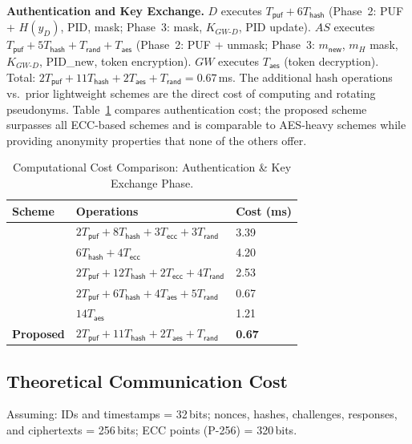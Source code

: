 \documentclass[conference]{IEEEtran}
\begin{document}
\textbf{Authentication and Key Exchange.}
$D$ executes $T_\mathsf{puf} + 6T_\mathsf{hash}$ (Phase~2: PUF +
$H(y_D)$, PID, mask; Phase~3: mask, $K_{GW\text{-}D}$, PID update).
$AS$ executes $T_\mathsf{puf} + 5T_\mathsf{hash} + T_\mathsf{rand} +
T_\mathsf{aes}$ (Phase~2: PUF + unmask; Phase~3: $m_\mathsf{new}$,
$m_H$ mask, $K_{GW\text{-}D}$, PID\_new, token encryption).
$GW$ executes $T_\mathsf{aes}$ (token decryption).
Total: $2T_\mathsf{puf} + 11T_\mathsf{hash} + 2T_\mathsf{aes} +
T_\mathsf{rand} = 0.67$\,ms.  The additional hash operations vs.\ prior
lightweight schemes are the direct cost of computing and rotating pseudonyms.
Table~\ref{tab:comp_auth} compares authentication cost; the proposed scheme
surpasses all ECC-based schemes and is comparable to AES-heavy schemes while
providing anonymity properties that none of the others offer.

\begin{table}[!t]
  \centering
  \caption{Computational Cost Comparison: Authentication \& Key Exchange Phase.}
  \label{tab:comp_auth}
  \scriptsize
  \setlength{\tabcolsep}{3pt}
  \begin{tabular}{lll}
    \toprule
    Scheme & Operations & Cost (ms) \\
    \midrule
    \cite{alruwaili2025raaf} & $2T_\mathsf{puf}+8T_\mathsf{hash}+3T_\mathsf{ecc}+3T_\mathsf{rand}$ & 3.39 \\
    \cite{yang2024sakms}     & $6T_\mathsf{hash}+4T_\mathsf{ecc}$ & 4.20 \\
    \cite{li2020puf}         & $2T_\mathsf{puf}+12T_\mathsf{hash}+2T_\mathsf{ecc}+4T_\mathsf{rand}$ & 2.53 \\
    \cite{zheng2022puf}      & $2T_\mathsf{puf}+6T_\mathsf{hash}+4T_\mathsf{aes}+5T_\mathsf{rand}$ & 0.67 \\
    \cite{rosa2023lightsae}  & $14T_\mathsf{aes}$ & 1.21 \\
    \textbf{Proposed}        & $2T_\mathsf{puf}+11T_\mathsf{hash}+2T_\mathsf{aes}+T_\mathsf{rand}$ & \textbf{0.67} \\
    \bottomrule
  \end{tabular}
\end{table}

\subsection{Theoretical Communication Cost}

Assuming: IDs and timestamps = 32\,bits; nonces, hashes, challenges,
responses, and ciphertexts = 256\,bits; ECC points (P-256) = 320\,bits.
\end{document}
